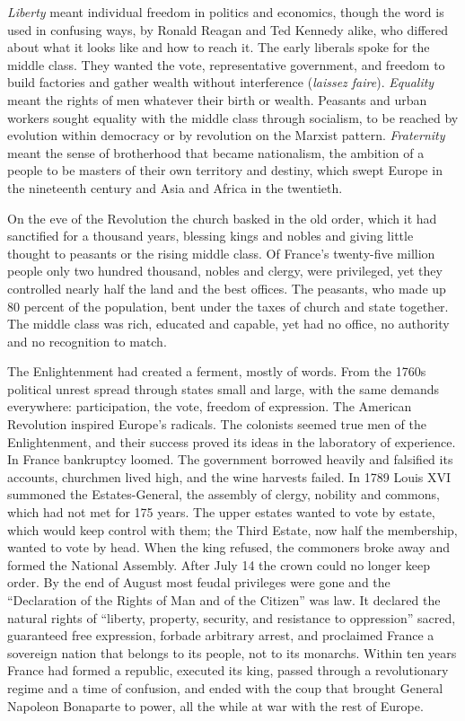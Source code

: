 \emph{Liberty} meant individual freedom in politics and economics, though the word is used in
confusing ways, by Ronald Reagan and Ted Kennedy alike, who differed about what it looks like and how
to reach it. The early liberals spoke for the middle class. They wanted the vote, representative
government, and freedom to build factories and gather wealth without interference (\emph{laissez
faire}). \emph{Equality} meant the rights of men whatever their birth or wealth. Peasants and urban
workers sought equality with the middle class through socialism, to be reached by evolution within
democracy or by revolution on the Marxist pattern. \emph{Fraternity} meant the sense of brotherhood
that became nationalism, the ambition of a people to be masters of their own territory and destiny,
which swept Europe in the nineteenth century and Asia and Africa in the twentieth.

On the eve of the Revolution the church basked in the old order, which it had sanctified for a
thousand years, blessing kings and nobles and giving little thought to peasants or the rising middle
class. Of France's twenty-five million people only two hundred thousand, nobles and clergy, were
privileged, yet they controlled nearly half the land and the best offices. The peasants, who made up 80 percent of the population, bent under the taxes of church and state together. The middle class was rich, educated and capable, yet had no office, no authority and no recognition to match.

The Enlightenment had created a ferment, mostly of words. From the 1760s political unrest spread
through states small and large, with the same demands everywhere: participation, the vote, freedom of
expression. The American Revolution inspired Europe's radicals. The colonists seemed true men of the
Enlightenment, and their success proved its ideas in the laboratory of experience. In France
bankruptcy loomed. The government borrowed heavily and falsified its accounts, churchmen lived high,
and the wine harvests failed. In 1789 Louis XVI summoned the Estates-General, the assembly of clergy,
nobility and commons, which had not met for 175 years. The upper estates wanted to vote by estate,
which would keep control with them; the Third Estate, now half the membership, wanted to vote by
head. When the king refused, the commoners broke away and formed the National Assembly. After July 14
the crown could no longer keep order. By the end of August most feudal privileges were gone and the
``Declaration of the Rights of Man and of the Citizen'' was law. It declared the natural rights of
``liberty, property, security, and resistance to oppression'' sacred, guaranteed free expression,
forbade arbitrary arrest, and proclaimed France a sovereign nation that belongs to its people, not to
its monarchs. Within ten years France had formed a republic, executed its king, passed through a
revolutionary regime and a time of confusion, and ended with the coup that brought General Napoleon
Bonaparte to power, all the while at war with the rest of Europe.

